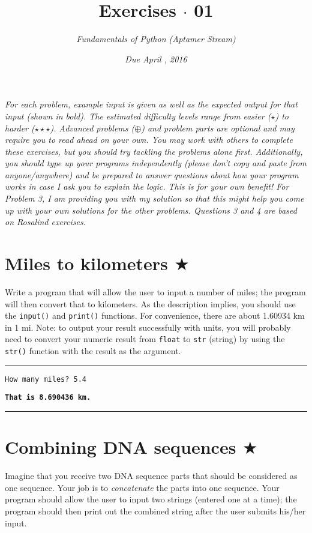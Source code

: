 \documentclass[12pt, letterpaper]{article}
\title{Exercises $\cdot$ 01}
\author{\textit{Fundamentals of Python (Aptamer Stream)}}
\date{\textit{Due April \nth{8}, 2016}}
\begin{document}
\maketitle
\textit{For each problem, example input is given as well as the expected output for that input (shown in bold). The estimated difficulty levels range from easier ($\star$) to harder ($\star\star\star$). Advanced problems ($\oplus$) and problem parts are optional and may require you to read ahead on your own. You may work with others to complete these exercises, but you should try tackling the problems alone first. Additionally, you should type up your programs independently (please don't copy and paste from anyone/anywhere) and be prepared to answer questions about how your program works in case I ask you to explain the logic. This is for your own benefit! For Problem 3, I am providing you with my solution so that this might help you come up with your own solutions for the other problems. Questions 3 and 4 are based on Rosalind exercises.}

\section{\upshape Miles to kilometers $\bigstar$}
Write a program that will allow the user to input a number of miles; the program will then convert that to kilometers. As the description implies, you should use the \texttt{input()} and \texttt{print()} functions. For convenience, there are about 1.60934 km in 1 mi. Note: to output your result successfully with units, you will probably need to convert your numeric result from \texttt{float} to \texttt{str} (string) by using the \texttt{str()} function with the result as the argument.

\vspace{2mm}\hrule\vspace{2mm}

\texttt{How many miles? 5.4}

\texttt{\bfseries That is 8.690436 km.}

\vspace{2mm}\hrule\vspace{2mm}

\section{\upshape Combining DNA sequences $\bigstar$}
Imagine that you receive two DNA sequence parts that should be considered as one sequence. Your job is to \emph{concatenate} the parts into one sequence. Your program should allow the user to input two strings (entered one at a time); the program should then print out the combined string after the user submits his/her input.
\end{document}

